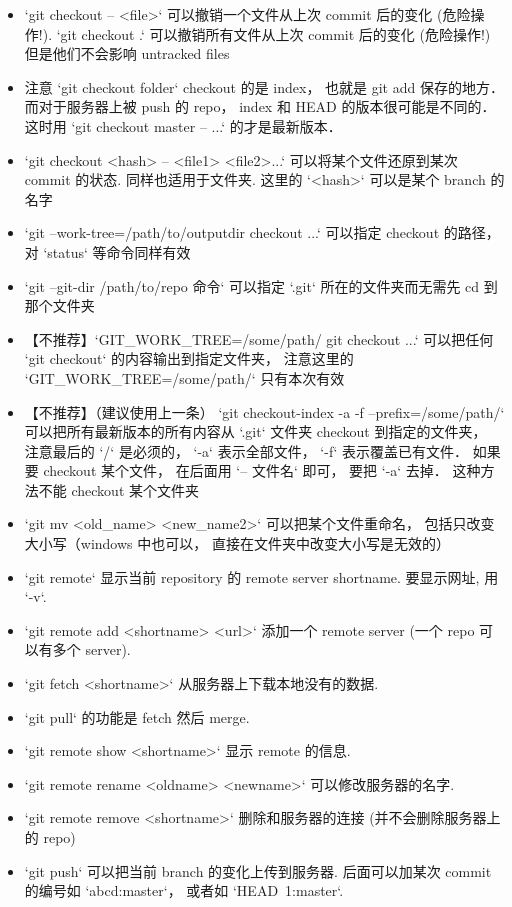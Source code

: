 \begin{itemize}
\item `git checkout -- <file>` 可以撤销一个文件从上次 commit 后的变化 (危险操作!). `git checkout .` 可以撤销所有文件从上次 commit 后的变化 (危险操作!) 但是他们不会影响 untracked files
\item 注意 `git checkout folder` checkout 的是 index， 也就是 git add 保存的地方． 而对于服务器上被 push 的 repo， index 和 HEAD 的版本很可能是不同的． 这时用 `git checkout master -- ...` 的才是最新版本．
\item `git checkout <hash> -- <file1> <file2>...` 可以将某个文件还原到某次 commit 的状态. 同样也适用于文件夹. 这里的 `<hash>` 可以是某个 branch 的名字
\item `git --work-tree=/path/to/outputdir checkout ...` 可以指定 checkout 的路径， 对 `status` 等命令同样有效
\item `git --git-dir /path/to/repo 命令` 可以指定 `.git` 所在的文件夹而无需先 cd 到那个文件夹
\item 【不推荐】`GIT_WORK_TREE=/some/path/ git checkout ...` 可以把任何 `git checkout` 的内容输出到指定文件夹， 注意这里的 `GIT_WORK_TREE=/some/path/` 只有本次有效
\item 【不推荐】（建议使用上一条） `git checkout-index -a -f --prefix=/some/path/` 可以把所有最新版本的所有内容从 `.git` 文件夹 checkout 到指定的文件夹， 注意最后的 `/` 是必须的， `-a` 表示全部文件， `-f` 表示覆盖已有文件． 如果要 checkout 某个文件， 在后面用 `-- 文件名` 即可， 要把 `-a` 去掉． 这种方法不能 checkout 某个文件夹
\item `git mv <old_name> <new_name2>` 可以把某个文件重命名， 包括只改变大小写（windows 中也可以， 直接在文件夹中改变大小写是无效的）
\item `git remote` 显示当前 repository 的 remote server shortname. 要显示网址, 用 `-v`.
\item `git remote add <shortname> <url>` 添加一个 remote server (一个 repo 可以有多个 server).
\item `git fetch <shortname>` 从服务器上下载本地没有的数据.
\item `git pull` 的功能是 fetch 然后 merge.
\item `git remote show <shortname>` 显示 remote 的信息.
\item `git remote rename <oldname> <newname>` 可以修改服务器的名字.
\item `git remote remove <shortname>` 删除和服务器的连接 (并不会删除服务器上的 repo)
\item `git push` 可以把当前 branch 的变化上传到服务器. 后面可以加某次 commit 的编号如 `abcd:master`， 或者如 `HEAD~1:master`.

\end{itemize}
